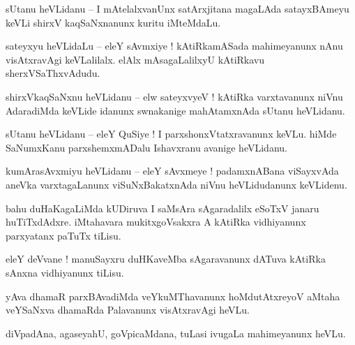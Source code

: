 \documentclass{article}
\begin{document}

\begin{mn}%
sUtanu heVLidanu -- I mAtelalxvanUnx satArxjitana magaLAda satayxBAmeyu keVLi shirxV kaqSaNxnanunx 
kuritu iMteMdaLu.
\end{mn}

\begin{mn}%
sateyxyu heVLidaLu -- eleY sAvmxiye ! kAtiRkamASada mahimeyanunx nAnu visAtxravAgi keVLalilalx. 
elAlx mAsagaLalilxyU kAtiRkavu sherxVSaThxvAdudu.
\end{mn}

\begin{mn}%
shirxVkaqSaNxnu heVLidanu -- elw sateyxvyeV ! kAtiRka varxtavanunx niVnu AdaradiMda keVLide 
idanunx swnakanige mahAtamxnAda sUtanu heVLidanu.
\end{mn}

\begin{mn}%
sUtanu heVLidanu -- eleY QuSiye ! I parxshonxVtatxravanunx keVLu. hiMde SaNumxKanu parxshemxmADalu 
Ishavxranu avanige heVLidanu.
\end{mn}

\begin{mn}%
kumArasAvxmiyu heVLidanu -- eleY sAvxmeye ! padamxnABana viSayxvAda aneVka varxtagaLanunx 
viSuNxBakatxnAda niVnu heVLidudanunx keVLidenu.
\end{mn}

\begin{mn}%
bahu duHaKagaLiMda kUDiruva I saMsAra sAgaradalilx eSoTxV janaru huTiTxdAdxre. iMtahavara 
mukitxgoVsakxra A kAtiRka vidhiyanunx parxyatanx paTuTx tiLisu.
\end{mn}

\begin{mn}%
eleY deVvane ! manuSayxru duHKaveMba sAgaravanunx dATuva kAtiRka sAnxna vidhiyanunx tiLisu.
\end{mn}

\begin{mn}%
yAva dhamaR parxBAvadiMda veYkuMThavanunx hoMdutAtxreyoV aMtaha veYSaNxva dhamaRda Palavanunx 
visAtxravAgi heVLu.
\end{mn}

\begin{mn}%
diVpadAna, agaseyahU, goVpicaMdana, tuLasi ivugaLa mahimeyanunx heVLu.
\end{mn}
\end{document}
